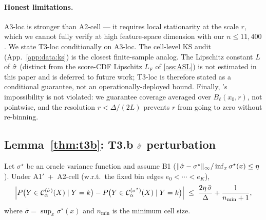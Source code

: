 \paragraph{Honest limitations.}
A3-loc is stronger than A2-cell --- it requires local stationarity at the scale $r$, which we cannot fully verify at high feature-space dimension with our $n \leq 11{,}400$. We state T3-loc conditionally on A3-loc. The cell-level KS audit (App.~\ref{app:data:ks}) is the closest finite-sample analog. The Lipschitz constant $L$ of $\hat{\sigma}$ (distinct from the score-CDF Lipschitz $L_F$ of \ref{ass:ASL}) is not estimated in this paper and is deferred to future work; T3-loc is therefore stated as a conditional guarantee, not an operationally-deployed bound. Finally, \citet{barber2020limits}'s impossibility is not violated: we guarantee coverage averaged over $B_\ell(x_0, r)$, not pointwise, and the resolution $r < \Delta / (2L)$ prevents $r$ from going to zero without re-binning.


\subsection{Lemma~\ref{thm:t3b}: T3.b $\hat{\sigma}$ perturbation}
\label{app:proofs:t3b}

\begin{lemma}
\label{thm:t3b}
Let $\sigma^\star$ be an oracle variance function and assume B1 ($\|\hat{\sigma} - \sigma^\star\|_\infty / \inf_x \sigma^\star(x) \leq \eta$). Under A1$'$~+~A2-cell (w.r.t.\ the fixed bin edges $e_0 < \cdots < e_K$),
\[
\left| P\bigl(Y \in \mathcal{C}_\alpha^{(\hat\sigma)}(X) \mid Y = k\bigr) - P\bigl(Y \in \mathcal{C}_\alpha^{(\sigma^\star)}(X) \mid Y = k\bigr) \right| \;\leq\; \frac{2\eta\,\bar\sigma}{\Delta} + \frac{1}{n_{\min} + 1},
\]
where $\bar\sigma = \sup_x \sigma^\star(x)$ and $n_{\min}$ is the minimum cell size.
\end{lemma}

